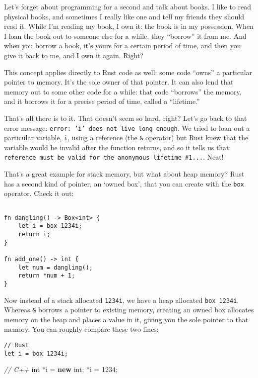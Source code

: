 \documentclass[]{article}
\newenvironment{Shaded}{}{}
\newcommand{\KeywordTok}[1]{\textcolor[rgb]{0.00,0.44,0.13}{\textbf{{#1}}}}
\newcommand{\DataTypeTok}[1]{\textcolor[rgb]{0.56,0.13,0.00}{{#1}}}
\newcommand{\DecValTok}[1]{\textcolor[rgb]{0.25,0.63,0.44}{{#1}}}
\newcommand{\CommentTok}[1]{\textcolor[rgb]{0.38,0.63,0.69}{\textit{{#1}}}}
\newcommand{\NormalTok}[1]{{#1}}
\begin{document}
Let's forget about programming for a second and talk about books. I like
to read physical books, and sometimes I really like one and tell my
friends they should read it. While I'm reading my book, I own it: the
book is in my possession. When I loan the book out to someone else for a
while, they ``borrow'' it from me. And when you borrow a book, it's
yours for a certain period of time, and then you give it back to me, and
I own it again. Right?

This concept applies directly to Rust code as well: some code ``owns'' a
particular pointer to memory. It's the sole owner of that pointer. It
can also lend that memory out to some other code for a while: that code
``borrows'' the memory, and it borrows it for a precise period of time,
called a ``lifetime.''

That's all there is to it. That doesn't seem so hard, right? Let's go
back to that error message:
\texttt{error: 'i' does not live long enough}. We tried to loan out a
particular variable, \texttt{i}, using a reference (the \texttt{\&}
operator) but Rust knew that the variable would be invalid after the
function returns, and so it tells us that:
\texttt{reference must be valid for the anonymous lifetime \#1...}.
Neat!

That's a great example for stack memory, but what about heap memory?
Rust has a second kind of pointer, an `owned box', that you can create
with the \texttt{box} operator. Check it out:

\begin{verbatim}

fn dangling() -> Box<int> {
    let i = box 1234i;
    return i;
}

fn add_one() -> int {
    let num = dangling();
    return *num + 1;
}
\end{verbatim}

Now instead of a stack allocated \texttt{1234i}, we have a heap
allocated \texttt{box 1234i}. Whereas \texttt{\&} borrows a pointer to
existing memory, creating an owned box allocates memory on the heap and
places a value in it, giving you the sole pointer to that memory. You
can roughly compare these two lines:

\begin{verbatim}
// Rust
let i = box 1234i;
\end{verbatim}

\begin{Shaded}
\begin{Highlighting}[]
\CommentTok{// C++}
\DataTypeTok{int} \NormalTok{*i = }\KeywordTok{new} \DataTypeTok{int}\NormalTok{;}
\NormalTok{*i = }\DecValTok{1234}\NormalTok{;}
\end{Highlighting}
\end{Shaded}
\end{document}
